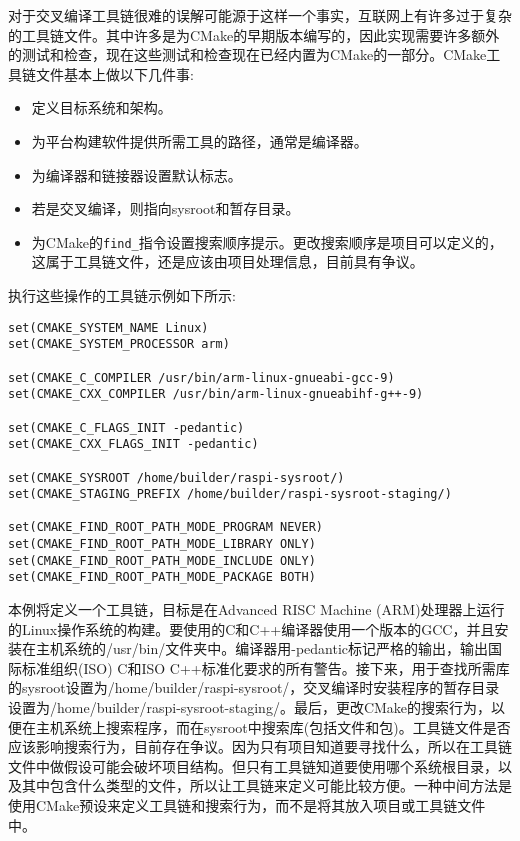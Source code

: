 
对于交叉编译工具链很难的误解可能源于这样一个事实，互联网上有许多过于复杂的工具链文件。其中许多是为CMake的早期版本编写的，因此实现需要许多额外的测试和检查，现在这些测试和检查现在已经内置为CMake的一部分。CMake工具链文件基本上做以下几件事:

\begin{itemize}
\item 
定义目标系统和架构。

\item 
为平台构建软件提供所需工具的路径，通常是编译器。

\item 
为编译器和链接器设置默认标志。

\item 
若是交叉编译，则指向sysroot和暂存目录。

\item 
为CMake的\texttt{find\_}指令设置搜索顺序提示。更改搜索顺序是项目可以定义的，这属于工具链文件，还是应该由项目处理信息，目前具有争议。
\end{itemize}

执行这些操作的工具链示例如下所示:

\begin{lstlisting}[style=styleCMake]
set(CMAKE_SYSTEM_NAME Linux)
set(CMAKE_SYSTEM_PROCESSOR arm)

set(CMAKE_C_COMPILER /usr/bin/arm-linux-gnueabi-gcc-9)
set(CMAKE_CXX_COMPILER /usr/bin/arm-linux-gnueabihf-g++-9)

set(CMAKE_C_FLAGS_INIT -pedantic)
set(CMAKE_CXX_FLAGS_INIT -pedantic)

set(CMAKE_SYSROOT /home/builder/raspi-sysroot/)
set(CMAKE_STAGING_PREFIX /home/builder/raspi-sysroot-staging/)

set(CMAKE_FIND_ROOT_PATH_MODE_PROGRAM NEVER)
set(CMAKE_FIND_ROOT_PATH_MODE_LIBRARY ONLY)
set(CMAKE_FIND_ROOT_PATH_MODE_INCLUDE ONLY)
set(CMAKE_FIND_ROOT_PATH_MODE_PACKAGE BOTH)
\end{lstlisting}

本例将定义一个工具链，目标是在Advanced RISC Machine (ARM)处理器上运行的Linux操作系统的构建。要使用的C和C++编译器使用一个版本的GCC，并且安装在主机系统的/usr/bin/文件夹中。编译器用-pedantic标记严格的输出，输出国际标准组织(ISO) C和ISO C++标准化要求的所有警告。接下来，用于查找所需库的sysroot设置为/home/builder/raspi-sysroot/，交叉编译时安装程序的暂存目录设置为/home/builder/raspi-sysroot-staging/。最后，更改CMake的搜索行为，以便在主机系统上搜索程序，而在sysroot中搜索库(包括文件和包)。工具链文件是否应该影响搜索行为，目前存在争议。因为只有项目知道要寻找什么，所以在工具链文件中做假设可能会破坏项目结构。但只有工具链知道要使用哪个系统根目录，以及其中包含什么类型的文件，所以让工具链来定义可能比较方便。一种中间方法是使用CMake预设来定义工具链和搜索行为，而不是将其放入项目或工具链文件中。

